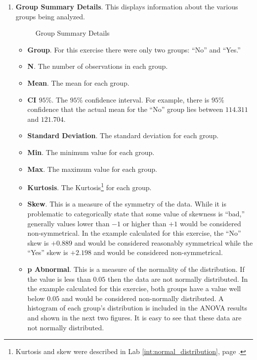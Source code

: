 \begin{enumerate}
\begin{enumerate}
    \item \textbf{Group Summary Details}. This displays information about the various groups being analyzed. 

    \begin{figure}[H]
      \begin{center}
        \caption{Group Summary Details}
      \end{center}
    \end{figure}
    
    \begin{itemize}
      \item \textbf{Group}. For this exercise there were only two groups: ``No'' and ``Yes.''
      \item \textbf{N}. The number of observations in each group.
      \item \textbf{Mean}. The mean for each group.
      \item \textbf{CI $ 95\% $}. The $ 95\% $ confidence interval. For example, there is $ 95\% $ confidence that the actual mean for the ``No'' group lies between $ 114.311 $ and $ 121.704 $. 
      \item \textbf{Standard Deviation}. The standard deviation for each group.
      \item \textbf{Min}. The minimum value for each group.
      \item \textbf{Max}. The maximum value for each group.
      \item \textbf{Kurtosis}. The Kurtosis\footnote{Kurtosis and skew were described in Lab \ref{int:normal_distribution}, page \pageref{int:normal_distribution}.} for each group.
      \item \textbf{Skew}. This is a measure of the symmetry of the data. While it is problematic to categorically state that some value of skewness is ``bad,'' generally values lower than $ -1 $ or higher than $ +1 $ would be considered non-symmetrical. In the example calculated for this exercise, the ``No'' skew is $ +0.889 $ and would be considered reasonably symmetrical while the ``Yes'' skew is $ +2.198 $ and would be considered non-symmetrical.
      \item \textbf{p Abnormal}. This is a measure of the normality of the distribution. If the value is less than $ 0.05 $ then the data are not normally distributed. In the example calculated for this exercise, both groups have a value well below $ 0.05 $ and would be considered non-normally distributed. A histogram of each group's distribution is included in the ANOVA results and shown in the next two figures. It is easy to see that these data are not normally distributed.


\end{itemize}
\end{enumerate}
\end{enumerate}
